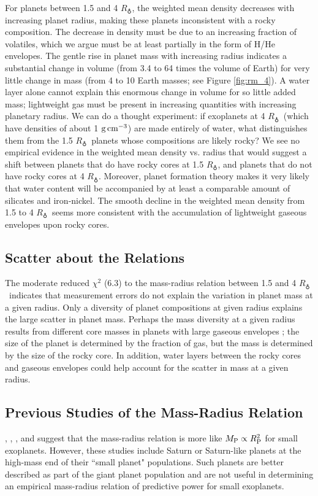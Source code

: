 \documentclass[iop]{emulateapj}
\newcommand{\gcmc}{\ensuremath{\rm g\,cm^{-3}}}
\newcommand{\gcc}{\gcmc}
\newcommand{\rpl}{\ensuremath{R_{\rm P}}}
\newcommand{\mpl}{\ensuremath{M_{\rm P}}}
\newcommand{\rearth}{\ensuremath{R_\earth}}
\begin{document}
For planets between 1.5 and 4 \rearth, the weighted mean density decreases with increasing planet radius, making these planets inconsistent with a rocky composition.  The decrease in density must be due to an increasing fraction of volatiles, which we argue must be at least partially in the form of H/He envelopes.  The gentle rise in planet mass with increasing radius indicates a substantial change in volume (from 3.4 to 64 times the volume of Earth) for very little change in mass (from 4 to 10 Earth masses; see Figure \ref{fig:rm_4}).  A water layer alone cannot explain this enormous change in volume for so little added mass; lightweight gas must be present in increasing quantities with increasing planetary radius.  We can do a thought experiment: if exoplanets at 4 \rearth\ (which have densities of about 1 \gcc) are made entirely of water, what distinguishes them from the 1.5 \rearth\ planets whose compositions are likely rocky?  We see no empirical evidence in the weighted mean density vs. radius that would suggest a shift between planets that do have rocky cores at 1.5 \rearth, and planets that do not have rocky cores at 4 \rearth.  Moreover, planet formation theory makes it very likely that water content will be accompanied by at least a comparable amount of silicates and iron-nickel.  The smooth decline in the weighted mean density from 1.5 to 4 \rearth\ seems more consistent with the accumulation of lightweight gaseous envelopes upon rocky cores.

\subsection{Scatter about the Relations}
The moderate reduced $\chi^2$ (6.3) to the mass-radius relation between 1.5 and 4 \rearth\ indicates that measurement errors do not explain the variation in planet mass at a given radius.  Only a diversity of planet compositions at given radius explains the large scatter in planet mass.  Perhaps the mass diversity at a given radius results from different core masses in planets with large gaseous envelopes \citep[as argued in ][]{Lopez2013}; the size of the planet is determined by the fraction of gas, but the mass is determined by the size of the rocky core.   In addition, water layers between the rocky cores and gaseous envelopes could help account for the scatter in mass at a given radius.

\subsection{Previous Studies of the Mass-Radius Relation}
\citet{Lissauer2011}, \citet{Enoch2012}, \citet{Kane2012}, and \citet{Weiss2013} suggest that the mass-radius relation is more like $\mpl \propto \rpl^2$ for small exoplanets.  However, these studies include Saturn or Saturn-like planets at the high-mass end of their ``small planet" populations.  Such planets are better described as part of the giant planet population and are not useful in determining an empirical mass-radius relation of predictive power for small exoplanets.
\end{document}
